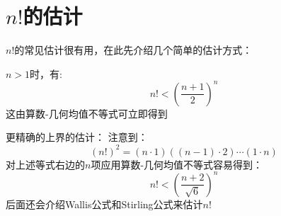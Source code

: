 \section{$n!$的估计}

$n!$的常见估计很有用，在此先介绍几个简单的估计方式：

\begin{proposition}
    $n > 1$时，有:
    \begin{equation*}
        n! < \left( \frac{n+1}{2} \right)^n    
    \end{equation*}
    这由算数-几何均值不等式可立即得到
\end{proposition}

更精确的上界的估计：
注意到：
\begin{equation*}
    (n!)^2 = (n \cdot 1)((n-1)\cdot 2) \cdots (1 \cdot n)
\end{equation*}
对上述等式右边的$n$项应用算数-几何均值不等式容易得到：
\begin{equation*}
    n! < \left( \frac{n+2}{\sqrt{6}} \right)^n
\end{equation*}
后面还会介绍Wallis公式和Stirling公式来估计$n!$